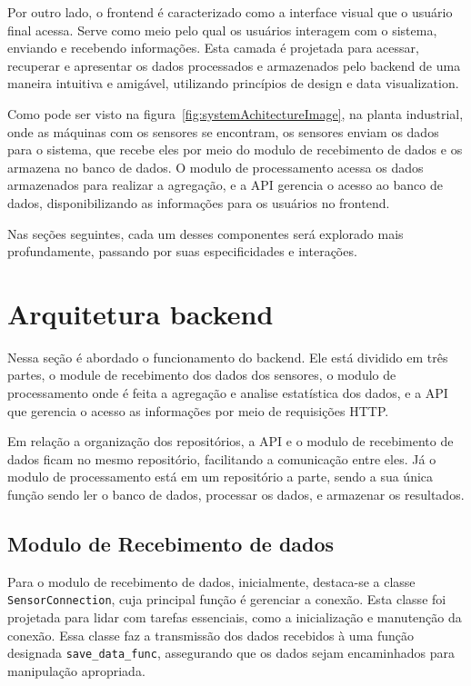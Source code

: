 Por outro lado, o frontend é caracterizado como a interface visual que o usuário final acessa. Serve como meio pelo qual os usuários interagem com o sistema, enviando e recebendo informações. Esta camada é projetada para acessar, recuperar e apresentar os dados processados e armazenados pelo backend de uma maneira intuitiva e amigável, utilizando princípios de design e data visualization.

Como pode ser visto na figura~\ref{fig:systemAchitectureImage}, na planta industrial, onde as máquinas com os sensores se encontram, os sensores enviam os dados para o sistema, que recebe eles por meio do modulo de recebimento de dados e os armazena no banco de dados. O modulo de processamento acessa os dados armazenados para realizar a agregação, e a API gerencia o acesso ao banco de dados, disponibilizando as informações para os usuários no frontend.

Nas seções seguintes, cada um desses componentes será explorado mais profundamente, passando por suas especificidades e interações.


\section[Arquitetura do backend]{Arquitetura backend}
Nessa seção é abordado o funcionamento do backend. Ele está dividido em três partes, o module de recebimento dos dados dos sensores, o modulo de processamento onde é feita a agregação e analise estatística dos dados, e a API que gerencia o acesso as informações por meio de requisições HTTP.

Em relação a organização dos repositórios, a API e o modulo de recebimento de dados ficam no mesmo repositório, facilitando a comunicação entre eles. Já o modulo de processamento está em um repositório a parte, sendo a sua única função sendo ler o banco de dados, processar os dados, e armazenar os resultados.

\subsection{Modulo de Recebimento de dados}
Para o modulo de recebimento de dados, inicialmente, destaca-se a classe \texttt{SensorConnection}, cuja principal função é gerenciar a conexão. Esta classe foi projetada para lidar com tarefas essenciais, como a inicialização e manutenção da conexão. Essa classe faz a transmissão dos dados recebidos à uma função designada \texttt{save\_data\_func}, assegurando que os dados sejam encaminhados para manipulação apropriada.

